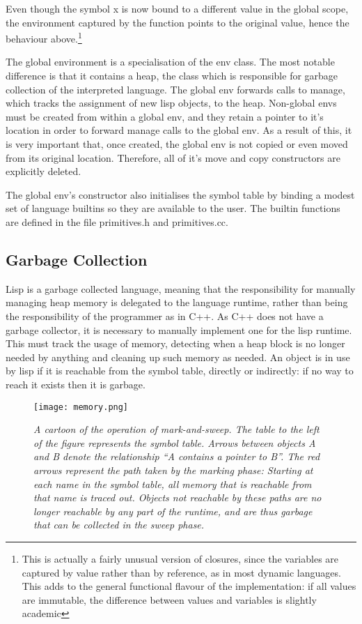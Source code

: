 \documentclass[12pt]{article}
\begin{document}
Even though the symbol x is now bound to a different value in the global
scope, the environment captured by the function points to the original
value, hence the behaviour above.\footnote{
This is actually a fairly unusual version of closures, since the variables
are captured by value rather than by reference, as in most dynamic languages.
This adds to the general functional flavour of the implementation: if all 
values are immutable, the difference between values and variables is slightly academic
}

The global environment is a specialisation of the env class. The most
notable difference is that it contains a heap, the class which is
responsible for garbage collection of the interpreted language. The
global env forwards calls to manage, which tracks the assignment of
new lisp objects, to the heap. Non-global envs must be created from
within a global env, and they retain a pointer to it's location in
order to forward manage calls to the global env. As a result of
this, it is very important that, once created, the global env is not
copied or even moved from its original location. Therefore, all of
it's move and copy constructors are explicitly deleted.

The global env's constructor also initialises the symbol table by
binding a modest set of language builtins so they are available to the
user. The builtin functions are defined in the file primitives.h and
primitives.cc.


\subsection{Garbage Collection}
\label{section:garbage}


Lisp is a garbage collected language, meaning that the responsibility
for manually managing heap memory is delegated to the language
runtime, rather than being the responsibility of the programmer as in
C++. As C++ does not have a garbage collector, it is necessary to
manually implement one for the lisp runtime. This must track the usage
of memory, detecting when a heap block is no longer needed by anything
and cleaning up such memory as needed. An object is in use by lisp if
it is reachable from the symbol table, directly or indirectly: if no
way to reach it exists then it is garbage.


\begin{figure}
  \centering
  \texttt{[image: memory.png]}
  \caption{\textit{
  A cartoon of the operation of mark-and-sweep. The table to the left of
  the figure represents the symbol table. Arrows between objects A and B
  denote the relationship ``A contains a pointer to B''. The red arrows
  represent the path taken by the marking phase: Starting at each name
  in the symbol table, all memory that is reachable from that name is
  traced out. Objects not reachable by these paths are no longer
  reachable by any part of the runtime, and are thus garbage that can be
  collected in the sweep phase.
  }}
\end{figure}
\end{document}

